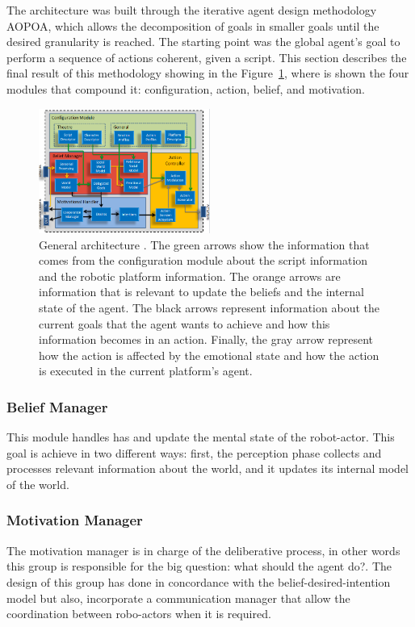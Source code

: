 The architecture was built through the iterative agent design methodology AOPOA, which allows the decomposition of goals in smaller goals until the desired granularity is reached\cite{GonzalezBustacara}. The starting point was the global agent's goal to perform a sequence of actions coherent, given a script. This section describes the final result of this methodology showing in the Figure~\ref{fig:generalArchitecture}, where is shown the four modules that compound it: configuration, action, belief, and motivation.
\begin{figure}
	\centering
	\includegraphics[width=0.5\textwidth]{Images/GeneralArchitecture.png} 
	\caption{General architecture . The green arrows show the information that comes from the configuration module about the script information and the robotic platform information. The orange arrows are information that is relevant to update the beliefs and the internal state of the agent. The black arrows represent information about the current goals that the agent wants to achieve and how this information becomes in an action. Finally, the gray arrow represent how the action is affected by the emotional state and how the action is executed in the current platform's agent.}
	\label{fig:generalArchitecture}
\end{figure}
\subsubsection{Belief Manager}
This module handles has and update the mental state of the robot-actor. This goal is achieve in two different ways: first, the perception phase collects and processes relevant information about the world, and it updates its internal model of the world.
\subsubsection{Motivation Manager}
The motivation manager is in charge of the deliberative process, in other words  this group is responsible for the big question: what should the agent do?. The design of this group has done in concordance with the belief-desired-intention model but also, incorporate a communication manager that allow the coordination between robo-actors when it is required.
